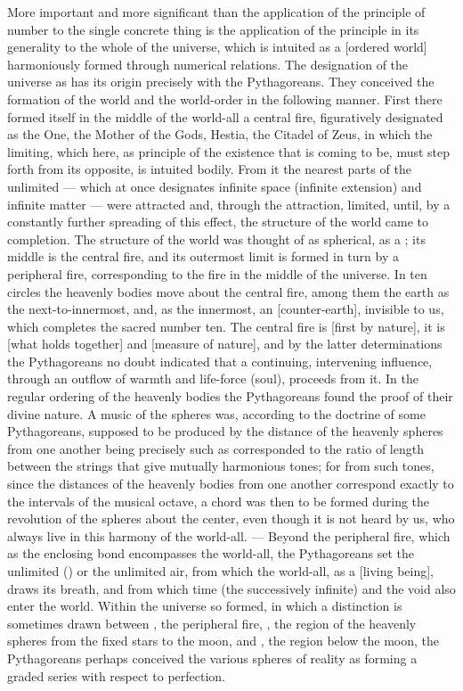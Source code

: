 More important and more significant than the application of the
principle of number to the single concrete thing is the application of
the principle in its generality to the whole of the universe, which is
intuited as a  [ordered world] harmoniously formed through
numerical relations. The designation of the universe as 
has its origin precisely with the Pythagoreans. They conceived the
formation of the world and the world-order in the following
manner. First there formed itself in the middle of the world-all a
central fire, figuratively designated as the One, the Mother of the
Gods, Hestia, the Citadel of Zeus, in which the limiting, which here,
as principle of the existence that is coming to be, must step forth
from its opposite, is intuited bodily. From it the nearest parts of the
unlimited --- which at once designates infinite space (infinite
extension) and infinite matter --- were attracted and, through the
attraction, limited, until, by a constantly further spreading of this
effect, the structure of the world came to completion. The structure of
the world was thought of as spherical, as a ; its middle is
the central fire, and its outermost limit is formed in turn by a
peripheral fire, corresponding to the fire in the middle of the
universe. In ten circles the heavenly bodies move about the central
fire, among them the earth as the next-to-innermost, and, as the
innermost, an  [counter-earth], invisible to us, which
completes the sacred number ten. The central fire is 
[first by nature], it is  [what holds together] and
 [measure of nature], and by the latter
determinations the Pythagoreans no doubt indicated that a continuing,
intervening influence, through an outflow of warmth and life-force
(soul), proceeds from it. In the regular ordering of the heavenly
bodies the Pythagoreans found the proof of their divine nature. A music
of the spheres was, according to the doctrine of some Pythagoreans,
supposed to be produced by the distance of the heavenly spheres from
one another being precisely such as corresponded to the ratio of length
between the strings that give mutually harmonious tones; for from such
tones, since the distances of the heavenly bodies from one another
correspond exactly to the intervals of the musical octave, a chord was
then to be formed during the revolution of the spheres about the
center, even though it is not heard by us, who always live in this
harmony of the world-all. --- Beyond the peripheral fire, which as the
enclosing bond encompasses the world-all, the Pythagoreans set the
unlimited () or the unlimited air, from which the
world-all, as a  [living being], draws its breath, and from
which time (the successively infinite) and the void also enter the
world. Within the universe so formed, in which a distinction
is sometimes drawn between , the peripheral fire,
, the region of the heavenly spheres from the fixed stars to
the moon, and , the region below the moon, the Pythagoreans
perhaps conceived the various spheres of reality as forming a graded
series with respect to perfection.

